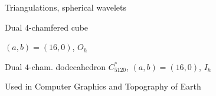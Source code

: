 \documentclass[%
pdf,
colorBG,
slideColor,
]{prosper}
\begin{document}








\begin{slide}{Triangulations, spherical wavelets}
\begin{center}
\begin{minipage}[b]{5.5cm}
\centering
{}\par
Dual $4$-chamfered cube \par
$(a,b)=(16,0)$, $O_h$
\end{minipage}
\begin{minipage}[b]{5.5cm}
\centering
{}\par
Dual $4$-cham.
dodecahedron $C^*_{5120}$,
$(a,b)=(16,0)$, $I_h$
\end{minipage}
\end{center}
\vspace{7mm}
\begin{center}
Used in Computer Graphics and Topography of Earth
\end{center}



\end{slide}
\end{document}
